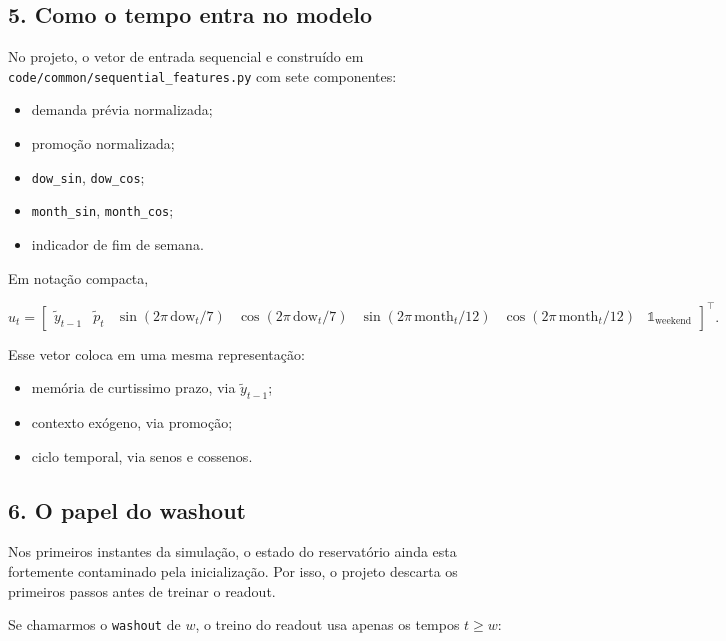 \documentclass[12pt]{article}
\providecommand{\tightlist}{%
  \setlength{\itemsep}{0pt}\setlength{\parskip}{0pt}}
\begin{document}
\subsection{5. Como o tempo entra no modelo}\label{5-como-o-tempo-entra-no-modelo}

No projeto, o vetor de entrada sequencial e construído em \texttt{code/common/sequential\_features.py} com sete componentes:

\begin{itemize}
\tightlist
\item
  demanda prévia normalizada;
\item
  promoção normalizada;
\item
  \texttt{dow\_sin}, \texttt{dow\_cos};
\item
  \texttt{month\_sin}, \texttt{month\_cos};
\item
  indicador de fim de semana.
\end{itemize}

Em notação compacta,

\[
u_t =
\begin{bmatrix}
\widetilde{y}_{t-1} &
\widetilde{p}_t &
\sin(2\pi \, \mathrm{dow}_t / 7) &
\cos(2\pi \, \mathrm{dow}_t / 7) &
\sin(2\pi \, \mathrm{month}_t / 12) &
\cos(2\pi \, \mathrm{month}_t / 12) &
\mathbb{1}_{\mathrm{weekend}}
\end{bmatrix}^\top.
\]

Esse vetor coloca em uma mesma representação:

\begin{itemize}
\tightlist
\item
  memória de curtissimo prazo, via \(\widetilde{y}_{t-1}\);
\item
  contexto exógeno, via promoção;
\item
  ciclo temporal, via senos e cossenos.
\end{itemize}

\subsection{6. O papel do washout}\label{6-o-papel-do-washout}

Nos primeiros instantes da simulação, o estado do reservatório ainda esta fortemente contaminado pela inicialização. Por isso, o projeto descarta os primeiros passos antes de treinar o readout.

Se chamarmos o \texttt{washout} de \(w\), o treino do readout usa apenas os tempos \(t \ge w\):
\end{document}
